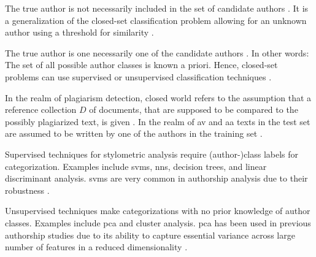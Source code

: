 \begin{definition}
    The true author is not necessarily included in the set of candidate authors \citep{stamatatos_survey_2009,barlas_cross_domain_2020,neal_surveying_2018}.
    It is a generalization of the closed-set classification problem allowing for an unknown author using a threshold for similarity \citep{neal_surveying_2018}.
\end{definition}

\begin{definition}
    The true author is one necessarily one of the candidate authors \citep{stamatatos_survey_2009,koppel_authorship_2011,barlas_cross_domain_2020,boenninghoff_o2d2_2021,neal_surveying_2018}.
    In other words: The set of all possible author classes is known a priori.
    Hence, closed-set problems can use supervised or unsupervised classification techniques \citep{abbasi_writeprints_2008}.
\end{definition}

\begin{definition}
    In the realm of plagiarism detection, closed world refers to the assumption 
    that a reference collection $D$ of documents, 
    that are supposed to be compared to the possibly plagiarized text, is given \citep{stein_intrinsic_2011}.
    In the realm of \ac{av} and \ac{aa} texts in the test set are assumed to be written by one of the authors in the training set \citep{boenninghoff_o2d2_2021,neal_surveying_2018}.
\end{definition}


\begin{definition}
    Supervised techniques for stylometric analysis require (author-)class labels for categorization.
    Examples include \acp{svm}, \acp{nn}, decision trees, and linear discriminant analysis.
    \acp{svm} are very common in authorship analysis due to their robustness \citep{abbasi_writeprints_2008}.
\end{definition}

\begin{definition}
    Unsupervised techniques make categorizations with no prior knowledge of author classes.
    Examples include \ac{pca} and cluster analysis.
    \ac{pca} has been used in previous authorship studies due to its ability to 
    capture essential variance across large number of features in a reduced dimensionality \citep{abbasi_writeprints_2008}.
\end{definition}

